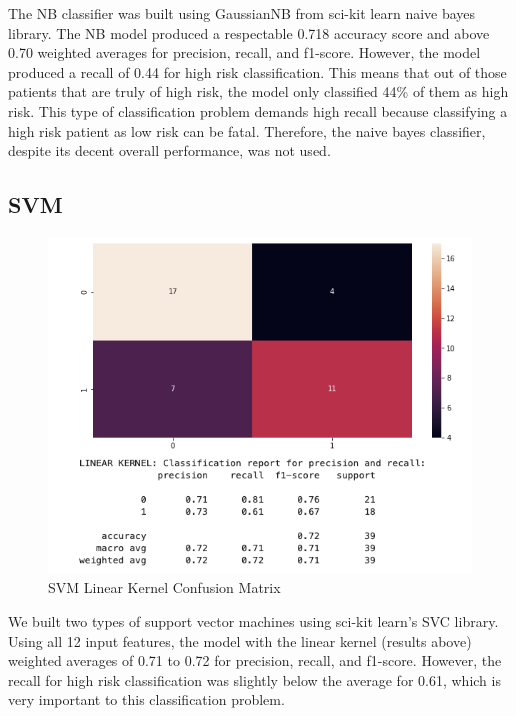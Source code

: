 \documentclass[11pt]{article}
\begin{document}
{The NB classifier was built using GaussianNB from sci-kit learn naive
bayes library. The NB model produced a respectable 0.718 accuracy score
and above 0.70 weighted averages for precision, recall, and f1-score.
However, the model produced a recall of 0.44 for high risk
classification. This means that out of those patients that are truly of
high risk, the model only classified 44\% of them as high risk. This
type of classification problem demands high recall because classifying a
high risk patient as low risk can be fatal. Therefore, the naive bayes
classifier, despite its decent overall performance, was not used.}

{}

\subsection{SVM}

\begin{figure}[H]
	\centering
	\includegraphics[width=7.5in]{figures/svm_lin_confusion.png}
	\caption{SVM Linear Kernel Confusion Matrix}\label{fig:figures/svm_lin_confusion.png}
\end{figure}

{}

{We built two types of support vector machines using sci-kit learn's SVC
library. Using all 12 input features, the model with the linear kernel
(results above) weighted averages of 0.71 to 0.72 for precision, recall,
and f1-score. However, the recall for high risk classification was
slightly below the average for 0.61, which is very important to this
classification problem. }
\end{document}
